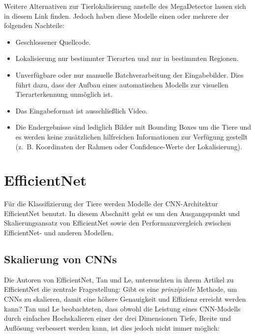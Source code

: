 Weitere Alternativen zur Tierlokalisierung anstelle des MegaDetector lassen sich in diesem Link finden. Jedoch haben diese Modelle einen oder mehrere der folgenden Nachteile:

\begin{itemize}
	\item Geschlossener Quellcode.
	
	\item Lokalisierung nur bestimmter Tierarten und nur in bestimmten Regionen.
	
	\item Unverfügbare oder nur manuelle Batchverarbeitung der Eingabebilder. Dies führt dazu, dass der Aufbau eines automatischen Modells zur visuellen Tierarterkennung unmöglich ist.
	
	\item Das Eingabeformat ist ausschließlich Video.
	
	\item Die Endergebnisse sind lediglich Bilder mit Bounding Boxes um die Tiere und es werden keine zusätzlichen hilfreichen Informationen zur Verfügung gestellt (z.~B. Koordinaten der Rahmen oder Confidence-Werte der Lokalisierung).
\end{itemize}

\section{EfficientNet} \label{sec:efficientnet}

Für die Klassifizierung der Tiere werden Modelle der CNN-Architektur EfficientNet benutzt. In diesem Abschnitt geht es um den Ausgangspunkt und Skalierungsansatz von EfficientNet sowie den Performanzvergleich zwischen EfficientNet- und anderen Modellen.

\subsection{Skalierung von CNNs}

Die Autoren von EfficientNet, Tan und Le, untersuchten in ihrem Artikel zu EfficientNet die zentrale Fragestellung: Gibt es eine \textit{prinzipielle} Methode, um CNNs zu skalieren, damit eine höhere Genauigkeit und Effizienz erreicht werden kann? Tan und Le beobachteten, dass obwohl die Leistung eines CNN-Modells durch einfaches Hochskalieren einer der drei Dimensionen Tiefe, Breite und Auflösung verbessert werden kann, ist dies jedoch nicht immer möglich:


